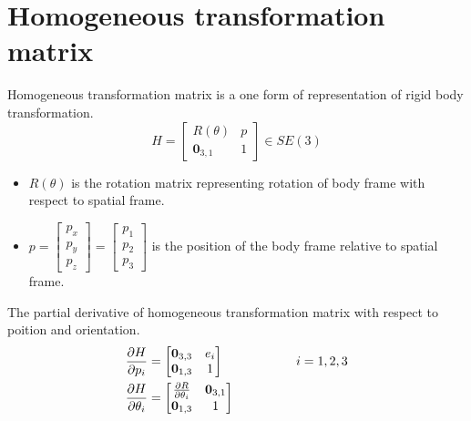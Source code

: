 \section{ Homogeneous transformation matrix}
\label{sec:htm}
Homogeneous transformation matrix is a one form of representation of rigid body transformation.
\begin{equation}
    H = \begin{bmatrix} R(\theta) & p \\ \textbf{0}_{3,1} &1 \end{bmatrix} \in SE(3)
\end{equation}
\begin{itemize}
    \item $R(\theta)$ is the rotation matrix representing rotation of body frame with respect to spatial frame. 
    \item $p = \begin{bmatrix} p_x \\ p_y \\ p_z \end{bmatrix} = \begin{bmatrix} p_1 \\ p_2 \\ p_3 \end{bmatrix} $ is the position of the body frame relative to spatial frame. 

\end{itemize}
The partial derivative of homogeneous transformation matrix with respect to poition and orientation.
\begin{equation}
    \begin{split}
    \frac{\partial {H}}{\partial {p_i}} &= \begin{bmatrix} \textbf{0}_{3,3} &e_i \\ \textbf{0}_{1,3} &1 \end{bmatrix} \hspace{2cm} i={1,2,3} \\
    \frac{\partial {H}}{\partial {\theta_i}} &= \begin{bmatrix} \frac{\partial {R}}{\partial {\theta_i}} &\textbf{0}_{3,1} \\ \textbf{0}_{1,3} &1 \end{bmatrix}
    \end{split}
\end{equation}

